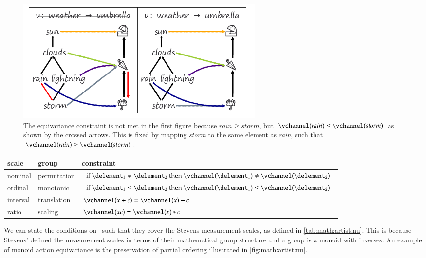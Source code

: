 \documentclass[journal]{vgtc}                %
\begin{document}
\begin{figure}[htb]
  \centering
  \includegraphics[width=1\columnwidth]{figures/partial_fixed.png}
  \caption{The equivariance constraint is not met in the first figure because \(rain\geq storm\), but \(\vchannel(rain) \leq \vchannel(storm)\) as shown by the crossed arrows. This is fixed by mapping \textit{storm} to the same element as \textit{rain}, such that \(\vchannel(rain) \geq \vchannel(storm)\).}
  \label{fig:math:artist:nu}
\end{figure}

\begin{table}[H]
  \renewcommand{\arraystretch}{2}
  \begin{tabulary}{\columnwidth}{|llL|}\hline
      \textbf{scale} & \textbf{group} & \textbf{constraint}\\ \hline
      nominal & permutation &  $\text{if } \delement_1 \neq \delement_2 \text{ then } \vchannel (\delement_1) \neq\vchannel(\delement_2)$\\
      ordinal &  monotonic & $\text{if } \delement_1 \leq \delement_2 \text{ then } \vchannel (\delement_1) \leq \vchannel(\delement_2)$\\
      interval &  translation &  $\vchannel (x + c) = \vchannel(x) + c$ \\
      ratio &  scaling &  $\vchannel(xc) = \vchannel(x)*c $\\ \hline
  \end{tabulary}
  \label{tab:math:artist:nu}
\end{table}
We can state the conditions on \vchannel\ such that they cover the Stevens measurement scales\cite{stevensTheoryScalesMeasurement1946}, as defined in \autoref{tab:math:artist:nu}. This is because Stevens’ defined the measurement scales in terms of their mathematical group structure and a group is a monoid with inverses\cite{remlingAlgebraMath5353}. An example of monoid action equivariance is the preservation of partial ordering illustrated in \autoref{fig:math:artist:nu}.
\end{document}
